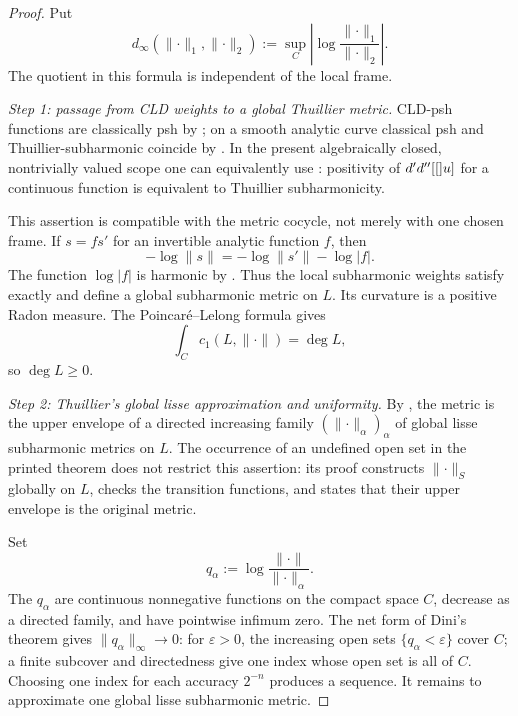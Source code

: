 \begin{proof}
Put
\[
 d_\infty(\lVert\cdot\rVert_1,\lVert\cdot\rVert_2)
 :=\sup_C\left|\log
       \frac{\lVert\cdot\rVert_1}{\lVert\cdot\rVert_2}\right|.
\]
The quotient in this formula is independent of the local frame.

\emph{Step 1: passage from CLD weights to a global Thuillier metric.}
CLD-psh functions are classically psh by
\cite[\S1.2]{GR25Classical}; on a smooth analytic curve classical psh and
Thuillier-subharmonic coincide by
\cite[\S4.1.2]{GR25Classical}. In the present algebraically closed,
nontrivially valued scope one can equivalently use
\cite[Thm.~4.7 and Cor.~4.8]{Wanner19}: positivity of
\(d'd''[[]u]\) for a continuous function is equivalent to
Thuillier subharmonicity.

This assertion is compatible with the metric cocycle, not merely with one
chosen frame. If \(s=f s'\) for an invertible analytic function \(f\), then
\[
 -\log\lVert s\rVert
 =-\log\lVert s'\rVert-\log|f|.
\]
The function \(\log|f|\) is harmonic by
\cite[Prop.~2.3.20]{Thu05}. Thus the local subharmonic weights satisfy
exactly \cite[Def.~3.4.17]{Thu05} and define a global subharmonic metric on
\(L\). Its curvature is a positive Radon measure. The
Poincar\'e--Lelong formula \cite[Prop.~3.3.15]{Thu05} gives
\[
             \int_C c_1(L,\lVert\cdot\rVert)=\deg L,
\]
so \(\deg L\geq0\).

\emph{Step 2: Thuillier's global lisse approximation and uniformity.}
By \cite[Thm.~3.4.19]{Thu05}, the metric is the upper envelope of a
directed increasing family
\((\lVert\cdot\rVert_\alpha)_\alpha\) of global lisse subharmonic metrics
on \(L\). The occurrence of an undefined open set in the printed theorem
does not restrict this assertion: its proof constructs
\(\lVert\cdot\rVert_S\) globally on \(L\), checks the transition functions,
and states that their upper envelope is the original metric.

Set
\[
 q_\alpha:=\log
 \frac{\lVert\cdot\rVert}{\lVert\cdot\rVert_\alpha}.
\]
The \(q_\alpha\) are continuous nonnegative functions on the compact space
\(C\), decrease as a directed family, and have pointwise infimum zero.
The net form of Dini's theorem gives
\(\lVert q_\alpha\rVert_\infty\to0\): for \(\varepsilon>0\), the
increasing open sets \(\{q_\alpha<\varepsilon\}\) cover \(C\); a finite
subcover and directedness give one index whose open set is all of \(C\).
Choosing one index for each accuracy \(2^{-n}\) produces a sequence. It
remains to approximate one global lisse subharmonic metric.


\end{proof}
